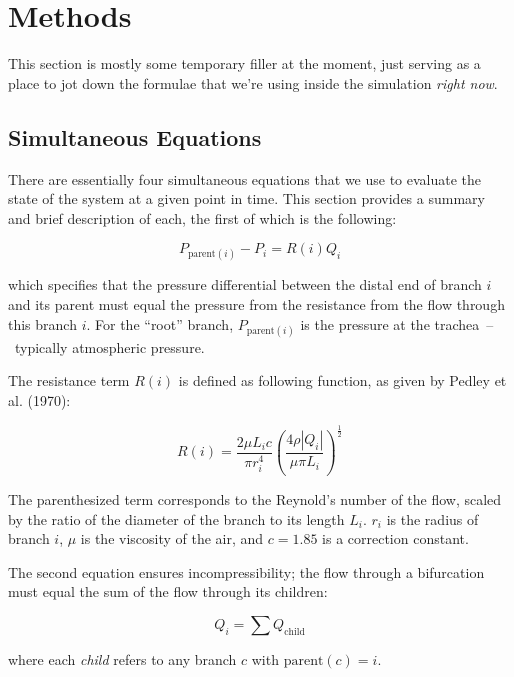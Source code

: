 %
\section{Methods}

This section is mostly some temporary filler at the moment, just serving as a place to jot down the
formulae that we're using inside the simulation \textit{right now}.

\subsection{Simultaneous Equations}

There are essentially four simultaneous equations that we use to evaluate the state of the system at
a given point in time. This section provides a summary and brief description of each, the first of
which is the following:

\begin{equation}
    P_{\text{parent}(i)} - P_i = R(i) Q_i
\end{equation}

\noindent
which specifies that the pressure differential between the distal end of branch $i$ and its parent
must equal the pressure from the resistance from the flow through this branch $i$. For the ``root''
branch, $P_{\text{parent}(i)}$ is the pressure at the trachea~--~typically atmospheric pressure.

The resistance term $R(i)$ is defined as following function, as given by Pedley et al. (1970):

\begin{equation*}
    R(i) = \frac{2 \mu L_i c}{\pi r_i^4} \left( \frac{4 \rho |Q_i|}{\mu \pi L_i} \right)^{\frac{1}{2}}
\end{equation*}

The parenthesized term corresponds to the Reynold's number of the flow, scaled by the ratio of the
diameter of the branch to its length $L_i$. $r_i$ is the radius of branch $i$, $\mu$ is the
viscosity of the air, and $c = 1.85$ is a correction constant.

The second equation ensures incompressibility; the flow through a bifurcation must equal the sum of
the flow through its children:

\begin{equation}
    Q_i = \sum Q_{\text{child}}
\end{equation}

\noindent
where each \textit{child} refers to any branch $c$ with $\text{parent}(c) = i$.

